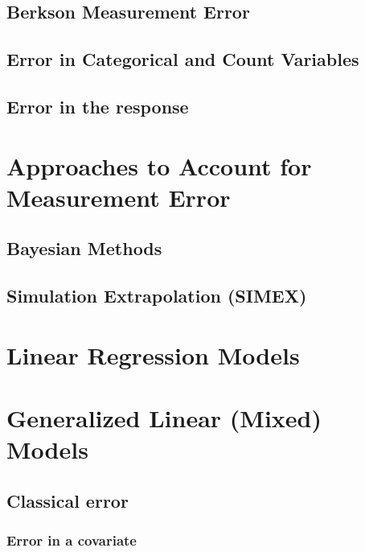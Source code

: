 \documentclass[]{book}
\theoremstyle{definition}
\theoremstyle{definition}
\theoremstyle{definition}
\theoremstyle{remark}
\begin{document}
\citep{fuller1987, galton1886}

\section{Berkson Measurement Error}\label{berkson-measurement-error-1}

\section{Error in Categorical and Count
Variables}\label{error-in-categorical-and-count-variables}

\section{Error in the response}\label{error-in-the-response}

\chapter{Approaches to Account for Measurement
Error}\label{approaches-to-account-for-measurement-error}

\section{Bayesian Methods}\label{bayesian-methods}

\section{Simulation Extrapolation
(SIMEX)}\label{simulation-extrapolation-simex}

\chapter{Linear Regression Models}\label{LinReg}

\chapter{Generalized Linear (Mixed) Models}\label{GLMMs}

\section{Classical error}\label{classical-error}

\subsection{Error in a covariate}\label{error-in-a-covariate}
\end{document}
